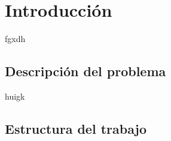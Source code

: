 \chapter{Introducción}\label{chap:Plan}

fgxdh

\section{Descripción del problema}

huigk

\section{Estructura del trabajo}



